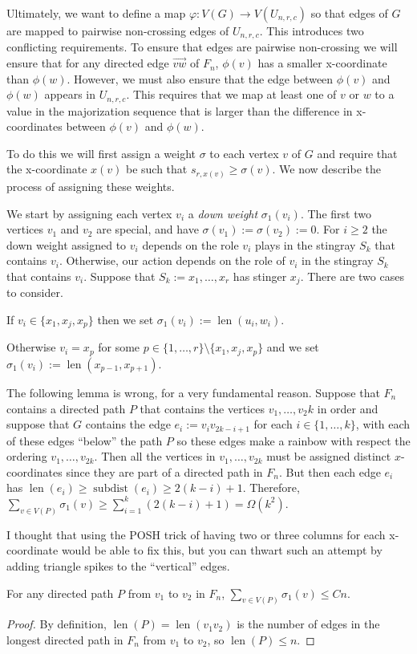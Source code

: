 \documentclass{patmorin}
\newenvironment{epat}{\color{Maroon}}{}
\newcommand{\defin}[1]{\emph{\color{brightmaroon}#1}}
\DeclareMathOperator{\sd}{subdist}
\DeclareMathOperator{\len}{len}
\begin{document}
Ultimately, we want to define a map $\varphi:V(G)\to V(U_{n,r,c})$ so that edges of $G$ are mapped to pairwise non-crossing edges of $U_{n,r,c}$.  This introduces two conflicting requirements. To ensure that edges are pairwise non-crossing we will ensure that for any directed edge $\overrightarrow{vw}$ of $F_n$, $\phi(v)$ has a smaller x-coordinate than $\phi(w)$.   However, we must also ensure that the edge between $\phi(v)$ and $\phi(w)$ appears in $U_{n,r,c}$. This requires that we map at least one of $v$ or $w$ to a value in the majorization sequence that is larger than the difference in x-coordinates between $\phi(v)$ and $\phi(w)$.

To do this we will first assign a weight $\sigma$ to each vertex $v$ of $G$ and require that the x-coordinate $x(v)$ be such that $s_{r,x(v)} \ge \sigma(v)$.  We now describe the process of assigning these weights.

We start by assigning each vertex $v_i$ a \defin{down weight} $\sigma_1(v_i)$. The first two vertices $v_1$ and $v_2$ are special, and have $\sigma(v_1):=\sigma(v_2):=0$.  For $i\ge 2$ the down weight assigned to $v_i$ depends on the role $v_i$ plays in the stingray $S_k$ that contains $v_i$.  Otherwise, our action depends on the role of $v_i$ in the stingray $S_k$ that contains $v_i$.  Suppose that $S_k:=x_1,\ldots,x_r$ has stinger $x_j$.  There are two cases to consider.
\begin{compactenum}
  \item If $v_i\in\{x_1,x_j,x_p\}$ then we set $\sigma_1(v_i):=\len(u_i,w_i)$.

  \item Otherwise $v_i=x_p$ for some $p\in\{1,\ldots,r\}\setminus\{x_1,x_j,x_p\}$ and we set $\sigma_1(v_i):=\len(x_{p-1},x_{p+1})$.
\end{compactenum}

\begin{epat}
  The following lemma is wrong, for a very fundamental reason.  Suppose that $F_n$ contains a directed path $P$ that contains the vertices $v_1,\ldots,v_2k$ in order and suppose that $G$ contains the edge $e_i:=v_iv_{2k-i+1}$ for each $i\in\{1,\ldots,k\}$, with each of these edges ``below'' the path $P$ so these edges make a rainbow with respect the ordering $v_1,\ldots,v_{2k}$.  Then all the vertices in $v_1,\ldots,v_{2k}$ must be assigned distinct $x$-coordinates since they are part of a directed path in $F_n$. But then each edge $e_i$ has $\len(e_i)\ge \sd(e_i)\ge 2(k-i)+1$. Therefore, $\sum_{v\in V(P)}\sigma_1(v)\ge \sum_{i=1}^k (2(k-i)+1) = \Omega(k^2)$.

  I thought that using the POSH trick of having two or three columns for each x-coordinate would be able to fix this, but you can thwart such an attempt by adding triangle spikes to the ``vertical'' edges.
\end{epat}

\begin{lem}
  For any directed path $P$ from $v_1$ to $v_2$ in $F_n$, $\sum_{v\in V(P)} \sigma_1(v) \le Cn$.
\end{lem}

\begin{proof}
  By definition, $\len(P)=\len(v_1v_2)$ is the number of edges in the longest directed path in $F_n$ from $v_1$ to $v_2$, so $\len(P)\le n$.
\end{proof}
\end{document}
